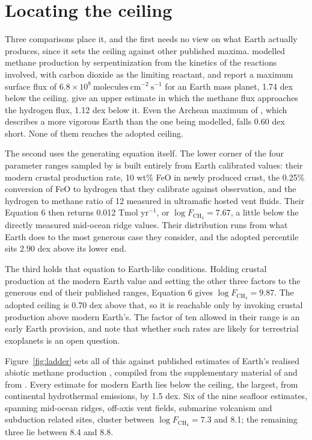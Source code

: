 \documentclass{aastex701}
\newcommand{\flux}{\mathrm{molecules\ cm^{-2}\ s^{-1}}}
\newcommand{\Fch}{F_{\mathrm{CH_4}}}
\begin{document}
\section{Locating the ceiling} \label{sec:locating}

Three comparisons place it, and the first needs no view on what Earth actually
produces, since it sets the ceiling against other published maxima.
\citet{guzman2013} modelled methane
production by serpentinization from the kinetics of the reactions involved, with
carbon dioxide as the limiting reactant, and report a maximum surface flux of
$6.8\times10^{8}\ \flux$ for an Earth mass planet, 1.74 dex below the ceiling.
\citet{merdith2020} give an upper estimate in which the methane flux approaches the
hydrogen flux, 1.12 dex below it. Even the Archean maximum of \citet{fiebig2007},
which describes a more vigorous Earth than the one being modelled, falls 0.60 dex
short. None of them reaches the adopted ceiling.

The second uses the generating equation itself. The lower corner of the four
parameter ranges sampled by \citet{kt2018} is built entirely from Earth calibrated
values: their modern crustal production rate, 10 wt\% FeO in newly produced crust,
the 0.25\% conversion of FeO to hydrogen that they calibrate against observation,
and the hydrogen to methane ratio of 12 measured in ultramafic hosted vent fluids.
Their Equation 6 then returns 0.012 Tmol yr$^{-1}$, or $\log \Fch = 7.67$, a little
below the directly measured mid-ocean ridge values. Their distribution runs from
what Earth does to the most generous case they consider, and the adopted
percentile sits 2.90 dex above its lower end.

The third holds that equation to Earth-like conditions. Holding crustal production at the modern Earth value and setting the other three
factors to the generous end of their published ranges, Equation 6 gives
$\log \Fch = 9.87$. The adopted ceiling is 0.70 dex above that, so it is reachable
only by invoking crustal production above modern Earth's. The factor of ten allowed
in their range is an early Earth provision, and \citet{kt2018} note that whether
such rates are likely for terrestrial exoplanets is an open question.

Figure~\ref{fig:ladder} sets all of this against published estimates of Earth's
realised abiotic methane production \citep{schindler2000, kasting2005, emmanuel2007,
fiebig2007, fiebig2009, cannat2010, keir2010, catling2017, klein2019, portella2019,
merdith2020}, compiled from the supplementary material of \citet{thompson2022} and
from \citet{merdith2020}. Every estimate for modern Earth lies below the ceiling,
the largest, from continental hydrothermal emissions, by 1.5 dex. Six of the nine
seafloor estimates, spanning mid-ocean ridges, off-axis vent fields,
submarine volcanism and subduction related sites, cluster between
$\log \Fch = 7.3$ and 8.1; the remaining three lie between 8.4 and 8.8.
\end{document}
